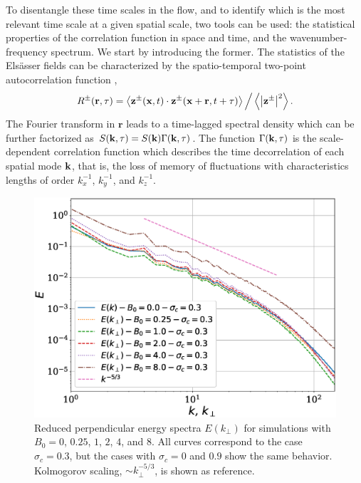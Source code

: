 \documentclass[aip,pop,reprint,amsmath,amssymb,floatfix]{revtex4-1}
\renewcommand{\vec}[1]{\mathbf{#1}}
\begin{document}
To disentangle these time scales in the flow, and to identify which is 
the most relevant time scale at a given spatial scale, two tools can be 
used: the statistical properties of the correlation function in space
and time, and the wavenumber-frequency spectrum. We start by
introducing the former. The statistics of the Els\"asser fields can be
characterized by the spatio-temporal two-point autocorrelation
function \cite{servidio_time_2011},
 \begin{equation}
 R^\pm({\bf r},\tau) = \left\langle {\bf z}^\pm( {\bf x},t) \cdot
   {\bf z} ^\pm( {\bf x} + {\bf r},t+\tau) \right\rangle \Big/ 
   \left\langle \left|{{\bf z}^\pm}\right|^2 \right\rangle.
 \label{eq:Rzij}
 \end{equation}
 The Fourier transform in $\vec{r}$ leads to a time-lagged spectral
 density which can be further factorized as
 $S({\bf k},\tau) = S({\bf k})\Gamma({\bf k},\tau)$. The function
 $\Gamma({\bf k},\tau)$ is the scale-dependent correlation function
 \cite{heisenberg_zur_1948,
   comte-bellot_simple_1971,orszag_numerical_1972} which describes the
 time decorrelation of each spatial mode ${\bf k}$, that is, the loss
 of memory of fluctuations with characteristics lengths of order
 $k_x^{-1}$, $k_y^{-1}$, and $k_z^{-1}$.

\begin{figure}
\centering
\includegraphics[width=1\columnwidth]{fig1_E.eps}
\caption{Reduced perpendicular energy spectra $E(k_\perp)$ for
  simulations with $B_0=0$, $0.25$, $1$, $2$, $4$, and $8$. All curves
  correspond to the case $\sigma_c = 0.3$, but the cases with
  $\sigma_c = 0$ and $0.9$ show the same behavior. Kolmogorov scaling,
  $\sim k_\perp^{-5/3}$, is shown as reference.}
\label{fig1:E}
\end{figure}
\end{document}
